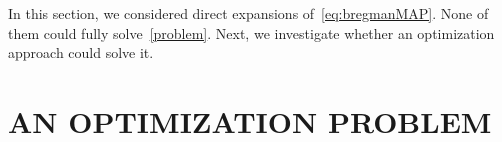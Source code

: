 \documentclass[twoside]{article}
\let\oldsection\section
\renewcommand{\section}[1]{\oldsection{\texorpdfstring{\uppercase{#1}}{#1}}}
\newcommand{\rlp}[1]{\textcolor{BrickRed}{(RLP:#1)}}
\newcommand{\logpart}{A}
\newcommand{\bregman}{\cB_\logpart}
\newcommand{\nat}{\theta}
\newcommand{\m}{\mu}
\newcommand{\lr}{\gamma} %
\begin{document}
In this section, we considered direct expansions of~\eqref{eq:bregmanMAP}.
None of them could fully solve~\eqref{problem}.
Next, we investigate whether an optimization approach could solve it.


\section{AN OPTIMIZATION PROBLEM}
\label{sec:optimization}

%
\end{document}
